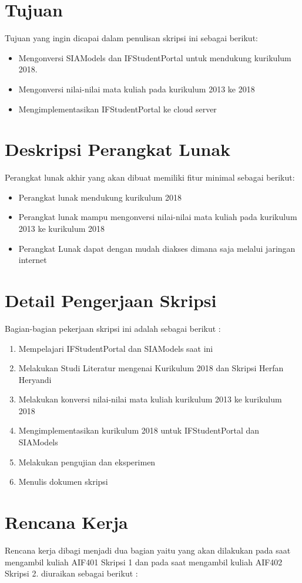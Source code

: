 \documentclass[a4paper,twoside]{article}
\begin{document}
\section{Tujuan}
Tujuan yang ingin dicapai dalam penulisan skripsi ini sebagai berikut:
\begin{itemize}
	\item Mengonversi SIAModels dan IFStudentPortal untuk mendukung kurikulum 2018.
	\item Mengonversi nilai-nilai mata kuliah pada kurikulum 2013 ke 2018
	\item Mengimplementasikan IFStudentPortal ke cloud server
\end{itemize}

\section{Deskripsi Perangkat Lunak}
Perangkat lunak akhir yang akan dibuat memiliki fitur minimal sebagai berikut:
\begin{itemize}
	\item Perangkat lunak mendukung kurikulum 2018
	\item Perangkat lunak mampu mengonversi nilai-nilai mata kuliah pada kurikulum 2013 ke kurikulum 2018
	\item Perangkat Lunak dapat dengan mudah diakses dimana saja melalui jaringan internet
\end{itemize}

\section{Detail Pengerjaan Skripsi}
Bagian-bagian pekerjaan skripsi ini adalah sebagai berikut :
	\begin{enumerate}
		\item Mempelajari IFStudentPortal dan SIAModels saat ini
		\item Melakukan Studi Literatur mengenai Kurikulum 2018 dan Skripsi Herfan Heryandi
		\item Melakukan konversi nilai-nilai mata kuliah kurikulum 2013 ke kurikulum 2018 
		\item Mengimplementasikan kurikulum 2018 untuk IFStudentPortal dan SIAModels
		\item Melakukan pengujian dan eksperimen
		\item Menulis dokumen skripsi
	\end{enumerate}

\section{Rencana Kerja}
Rencana kerja dibagi menjadi dua bagian yaitu yang akan dilakukan pada saat mengambil kuliah AIF401 Skripsi 1 dan pada saat mengambil kuliah AIF402 Skripsi 2. diuraikan sebagai berikut :
\end{document}
